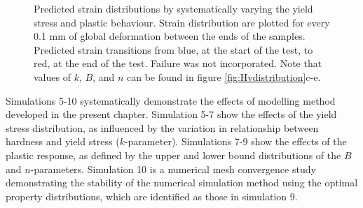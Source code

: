 \begin{figure}[!]
	\hfill
	\centering
	\caption[Strain predictions based on systematic incorporation of complex mechanical properties]{Predicted strain distributions by systematically varying the yield stress and plastic behaviour. Strain distribution are plotted for every 0.1 mm of global deformation between the ends of the samples. Predicted strain transitions from blue, at the start of the test, to red, at the end of the test. Failure was not incorporated. Note that values of $k$, $B$, and $n$ can be found in figure \ref{fig:Hvdistribution}c-e.}
	\label{fig:Systematicmechs}
\end{figure}

Simulations 5-10 systematically demonstrate the effects of modelling method developed in the present chapter. Simulation 5-7 show the effects of the yield stress distribution, as influenced by the variation in relationship between hardness and yield stress ($k$-parameter). Simulations 7-9 show the effects of the plastic response, as defined by the upper and lower bound distributions of the $B$ and $n$-parameters. Simulation 10 is a numerical mesh convergence study demonstrating the stability of the numerical simulation method using the optimal property distributions, which are identified as those in simulation 9. 

